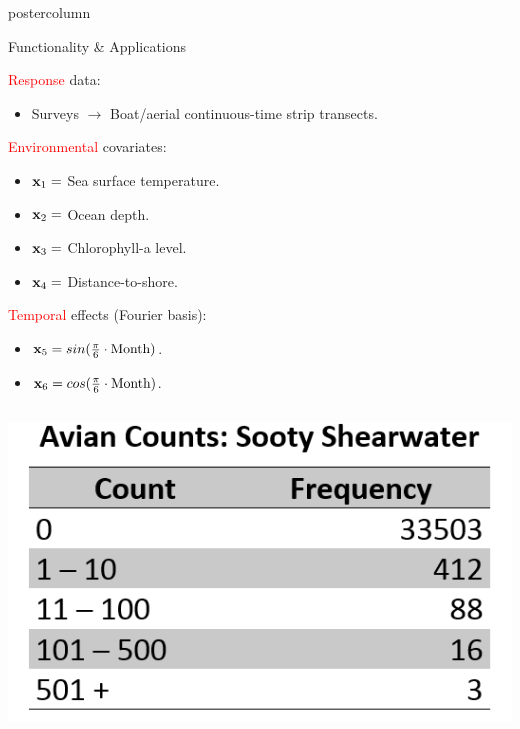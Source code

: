 \documentclass[final]{beamer}\usepackage[]{graphicx}\usepackage[]{color}
\newcommand{\bfx}{\mbox{\bf x} }
\newcommand{\red}{\textcolor{red}}
\begin{document}
{\begin{frame}
\begin{columns}
\begin{column}{.33\textwidth}
\begin{beamercolorbox}[center,wd=\textwidth]{postercolumn}
\begin{minipage}[T]{.97\textwidth}
{\begin{block}{Functionality \& Applications}
\begin{minipage}[t][0.1mm]{.5\textwidth}
	\vspace{2mm}
 \red{Response} data:
	\begin{itemize}
		\item[] Surveys $\rightarrow$ Boat/aerial continuous-time strip transects.
	\end{itemize}
\vspace{0.7cm}
\red{Environmental} covariates:
	\begin{itemize}
		\item[] $\bfx_1=$ Sea surface  temperature.
		\item[] $\bfx_2=$ Ocean depth.
		\item[] $\bfx_3=$ Chlorophyll-a level.
		\item[] $\bfx_4=$ Distance-to-shore.
	\end{itemize}
\vspace{0.7cm}
\red{Temporal} effects (Fourier basis):
	 \begin{itemize}
	 	\item[] $\bfx_5=sin(\frac{\pi}{6}\cdot \mbox{Month})$.
	 	\item[] $\bfx_6=cos(\frac{\pi}{6}\cdot \mbox{Month})$.
	 \end{itemize}

\end{minipage}

\begin{columns}
	\flushright

	\flushleft

	\vspace{-1cm}
	\footnotesize
	\centering
	\includegraphics[scale=0.9]{table1.png}\ \
\end{columns}

\vspace{9.1cm}


\end{block}}
\end{minipage}
\end{beamercolorbox}
\end{column}
\end{columns}
\end{frame}}
\end{document}
